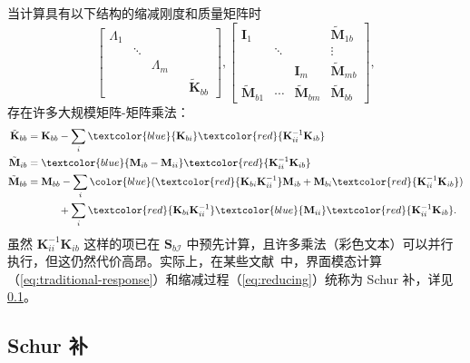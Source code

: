 当计算具有以下结构的缩减刚度和质量矩阵时
\begin{equation}
  \begin{bmatrix}
    \Lambda_{1} &&&&\\
    &\ddots&&&\\
    &&\Lambda_{m}&&\\
    &&&&\tilde{\mathbf{K}}_{bb}
  \end{bmatrix},
  \begin{bmatrix}
    \mathbf{I}_{1} & & & \tilde{\mathbf{M}}_{1b}\\
    &\ddots & & \vdots\\
    & & \mathbf{I}_{m} & \tilde{\mathbf{M}}_{mb}\\
    \tilde{\mathbf{M}}_{b1} &\cdots &\tilde{\mathbf{M}}_{bm} &\tilde{\mathbf{M}}_{bb}
  \end{bmatrix},
\end{equation}
存在许多大规模矩阵-矩阵乘法：
\begin{equation}
  \begin{split}
    \tilde{\mathbf{K}}_{bb} &= \mathbf{K}_{bb} - \sum_i{\textcolor{blue}{\mathbf{K}_{bi}}
      \textcolor{red}{\mathbf{K}_{ii}^{-1} \mathbf{K}_{ib}}}\\
    \tilde{\mathbf{M}}_{ib} &= \textcolor{blue}{\mathbf{M}_{ib} -
    \mathbf{M}_{ii}} \textcolor{red}{\mathbf{K}_{ii}^{-1}\mathbf{K}_{ib}}\\
    \tilde{\mathbf{M}}_{bb} &= \mathbf{M}_{bb} - \sum_i{\color{blue} (\textcolor{red}{\mathbf{K}_{bi}
\mathbf{K}_{ii}^{-1}} \mathbf{M}_{ib} + \mathbf{M}_{bi} \textcolor{red}{\mathbf{K}_{ii}^{-1}
\mathbf{K}_{ib}})}\\
&\quad\quad\quad+\sum_i \textcolor{red}
    {\mathbf{K}_{bi}\mathbf{K}_{ii}^{-1}}\textcolor{blue}{\mathbf{M}_{ii}}
\textcolor{red}{\mathbf{K}_{ii}^{-1} \mathbf{K}_{ib}}.
  \end{split}
  \label{eq:reducing}
\end{equation}
虽然 $\mathbf{K}_{ii}^{-1}\mathbf{K}_{ib}$ 这样的项已在 $\mathbf{S}_{b\mathcal{I}}$ 中预先计算，且许多乘法（彩色文本）可以并行执行，但这仍然代价高昂。实际上，在某些文献~\cite{aristidou2013dynamic}中，界面模态计算（\cref{eq:traditional-response}）和缩减过程（\cref{eq:reducing}）统称为 Schur 补，详见 \cref{sec:schur-complement}。


\subsection{Schur 补}\label{sec:schur-complement}


